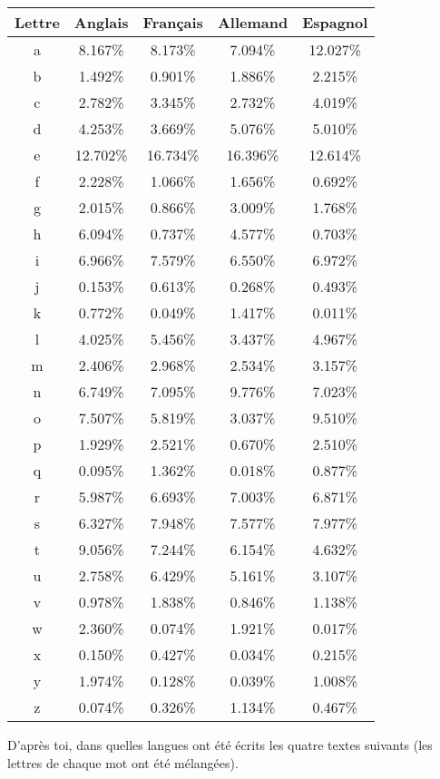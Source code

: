 \documentclass[11pt,class=report,crop=false]{standalone}
\begin{document}
\begin{activite}
\begin{enumerate}
\begin{center}
\begin{tabular}{|c||c|c|c|c|} 
\hline
Lettre & Anglais & Français & Allemand & Espagnol \\\hline\hline
a&8.167\%&8.173\%&7.094\%&12.027\% \\
b&1.492\%&0.901\%&1.886\%&2.215\% \\
c&2.782\%&3.345\%&2.732\%&4.019\% \\
d&4.253\%&3.669\%&5.076\%&5.010\% \\
e&12.702\%&16.734\%&16.396\%&12.614\% \\
f&2.228\%&1.066\%&1.656\%&0.692\% \\
g&2.015\%&0.866\%&3.009\%&1.768\% \\
h&6.094\%&0.737\%&4.577\%&0.703\% \\
i&6.966\%&7.579\%&6.550\%&6.972\% \\
j&0.153\%&0.613\%&0.268\%&0.493\% \\
k&0.772\%&0.049\%&1.417\%&0.011\% \\
l&4.025\%&5.456\%&3.437\%&4.967\% \\
m&2.406\%&2.968\%&2.534\%&3.157\% \\
n&6.749\%&7.095\%&9.776\%&7.023\% \\
o&7.507\%&5.819\%&3.037\%&9.510\% \\
p&1.929\%&2.521\%&0.670\%&2.510\% \\
q&0.095\%&1.362\%&0.018\%&0.877\% \\
r&5.987\%&6.693\%&7.003\%&6.871\% \\
s&6.327\%&7.948\%&7.577\%&7.977\% \\
t&9.056\%&7.244\%&6.154\%&4.632\% \\
u&2.758\%&6.429\%&5.161\%&3.107\% \\
v&0.978\%&1.838\%&0.846\%&1.138\% \\
w&2.360\%&0.074\%&1.921\%&0.017\% \\
x&0.150\%&0.427\%&0.034\%&0.215\% \\
y&1.974\%&0.128\%&0.039\%&1.008\% \\
z&0.074\%&0.326\%&1.134\%&0.467\% \\ 
\hline
\end{tabular} 
\end{center}

\bigskip

D'après toi, dans quelles langues ont été écrits les quatre textes suivants (les lettres de chaque mot ont été mélangées).


\end{enumerate}
\end{activite}
\end{document}

